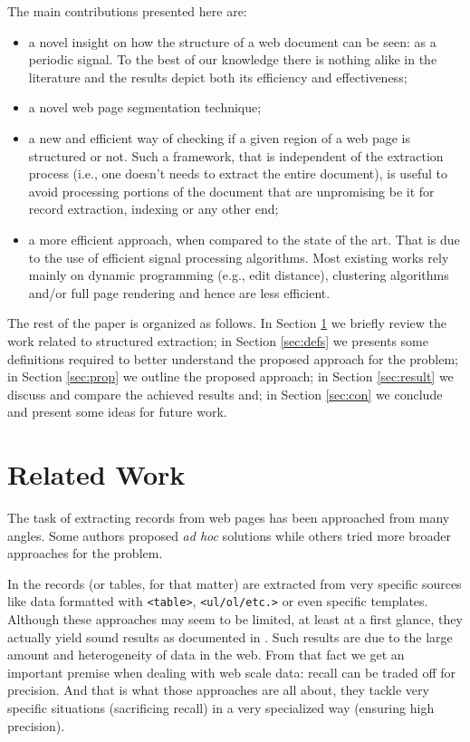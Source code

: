 \documentclass{vldb}
\begin{document}
The main contributions presented here are:
\begin{itemize}
    \item a novel insight on how the structure of a web document can be seen: as a periodic signal. To the best of our knowledge there is nothing alike in the literature and the results depict both its efficiency and effectiveness;
    \item a novel web page segmentation technique;
    \item a new and efficient way of checking if a given region of a web page is structured or not. Such a framework, that is independent of the extraction process (i.e., one doesn't needs to extract the entire document), is useful to avoid processing portions of the document that are unpromising be it for record extraction, indexing or any other end;
    \item a more efficient approach, when compared to the state of the art. That is due to the use of efficient signal processing algorithms. Most existing works rely mainly on dynamic programming (e.g., edit distance), clustering algorithms and/or full page rendering and hence are less efficient.
\end{itemize}

The rest of the paper is organized as follows. In Section \ref{sec:work} we
briefly review the work related to structured extraction; in Section
\ref{sec:defs} we presents some definitions required to better understand the
proposed approach for the problem; in Section \ref{sec:prop} we outline the
proposed approach; in Section \ref{sec:result} we discuss and compare the
achieved results and; in Section \ref{sec:con} we conclude and present some
ideas for future work.

\section{Related Work}\label{sec:work}

The task of extracting records from web pages has been approached from many
angles. Some authors proposed \textit{ad hoc} solutions while others tried more
broader approaches for the problem.

In \cite{webtables2008, listExtract2009, tablesMS2012, tegra2015, topklists2013}
the records (or tables, for that matter) are extracted from very specific
sources like data formatted with \texttt{<table>}, \texttt{<ul/ol/etc.>} or even
specific templates. Although these approaches may seem to be limited, at least
at a first glance, they actually yield sound results as documented in
\cite{relationalWeb2008, probase, probase2012, acsdb}. Such results are due to
the large amount and heterogeneity of data in the web. From that fact we get an
important premise when dealing with web scale data: recall can be traded off for
precision. And that is what those approaches are all about, they tackle very
specific situations (sacrificing recall) in a very specialized way (ensuring
high precision).
\end{document}
